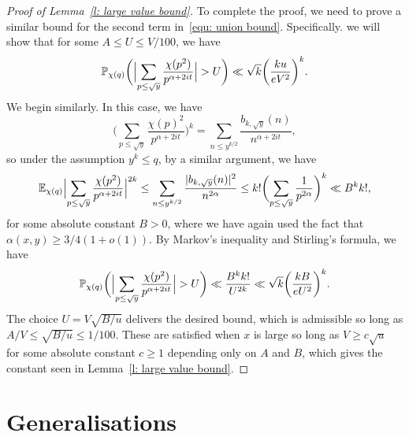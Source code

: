 \documentclass[a4paper,12pt,reqno]{amsart}
\newcommand{\E}{\mathbb{E}}
\newcommand{\p}{\mathbb{P}}
\begin{document}
\begin{proof}[Proof of Lemma~\ref{l: large value bound}]
To complete the proof, we need to prove a similar bound for the second term in~\eqref{equ: union bound}. Specifically. we will show that for some $A \leq U \leq V/100$, we have
\[
\p_{\chi(q)}\biggl( \Bigl| \sum_{p \leq \sqrt{y}} \frac{\chi(p^2)}{p^{\alpha + 2it}} \Bigr| > U \biggr) \ll \sqrt{k} \biggl( \frac{k u}{e V^2} \biggr)^k .
\]
We begin similarly. In this case, we have
\[
\biggl( \sum_{p \leq \sqrt{y}} \frac{\chi(p)^2}{p^{\alpha + 2it}} \biggr)^k = \sum_{n \leq y^{k/2}} \frac{b_{k, \sqrt{y}} (n)}{n^{\alpha + 2it}},
\]
so under the assumption $y^k \leq q$, by a similar argument, we have
\[
\E_{\chi(q)} \Bigl| \sum_{p \leq \sqrt{y}} \frac{\chi(p^2)}{p^{\alpha + 2it}} \Bigr|^{2k} \leq \sum_{n \leq y^{k/2}} \frac{|b_{k, \sqrt{y}} (n)|^2}{n^{2\alpha}} \leq k! \biggl( \sum_{p \leq \sqrt{y}} \frac{1}{p^{2 \alpha}} \biggr)^k \ll B^k k! ,
\]
for some absolute constant $B>0$, where we have again used the fact that $\alpha (x,y) \geq 3/4 (1+o(1))$. By Markov's inequality and Stirling's formula, we have
\[
\p_{\chi(q)}\biggl( \Bigl| \sum_{p \leq \sqrt{y}} \frac{\chi(p^2)}{p^{\alpha + 2it}} \Bigr| > U \biggr) \ll \frac{B^k k!}{U^{2k}} \ll \sqrt{k} \biggl( \frac{k B}{e U^2} \biggr)^{k} .
\]
The choice $U = V \sqrt{B/u}$ delivers the desired bound, which is admissible so long as $A / V \leq \sqrt{B/u} \leq 1/100$. These are satisfied when $x$ is large so long as $V \geq c \sqrt{u}$ for some absolute constant $c \geq 1$ depending only on $A$ and $B$, which gives the constant seen in Lemma~\ref{l: large value bound}.
\end{proof}

\section{Generalisations}\label{s: other families}
\end{document}
